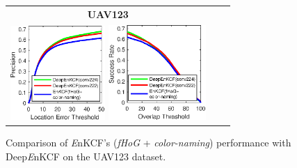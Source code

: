 \documentclass[10pt,twocolumn,letterpaper]{article}
\begin{document}

\begin{figure}[!h]
\centering
\begin{tabular}{ccc}
\tiny\quad\quad\textbf{UAV123}\\
\includegraphics[width=3.60cm]{./figures/pr_deep.eps}
\includegraphics[width=3.70cm]{./figures/sr_deep.eps}\\
\end{tabular}
\caption{Comparison of {\it E}nKCF's ({\it fHoG} + {\it color-naming}) performance with Deep{\it E}nKCF on the UAV123
dataset.}
\label{fig:UAV123_DATASET_DeepFeatures}
\end{figure}

\end{document}
